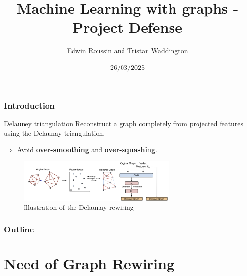 \documentclass[10pt, aspectratio = 169]{beamer}
\title{Machine Learning with graphs - Project Defense}
\subtitle{Delaunay Graph: Addressing Over-Squashing and Over-Smoothing Using
Delaunay Triangulation\\
by Attali H., Duscaldi D. and Pernelle N. \texorpdfstring{\cite{attali2024delaunay}}}
\author{Edwin Roussin and Tristan Waddington}
\institute{IP-Paris, CEMST}
\date{26/03/2025}
\begin{document}
\begin{frame}
    \titlepage
\end{frame}

\begin{frame}
    \frametitle{Introduction}
    \begin{block}{Delauney triangulation}
    Reconstruct a graph completely from projected features using the Delaunay triangulation.

    $\Rightarrow$ Avoid \textbf{over-smoothing} and \textbf{over-squashing}.
    \end{block}
    
    \begin{figure}
        \includegraphics[width=0.7\textwidth]{figures/Delaunay-Rewiring.png}
        \caption{Illustration of the Delaunay rewiring \cite[Attali al., 2024]{attali2024delaunay}}
    \end{figure}
\end{frame}


\begin{frame}
    \frametitle{Outline}
    \tableofcontents
\end{frame}

\section{Need of Graph Rewiring}
\end{document}
